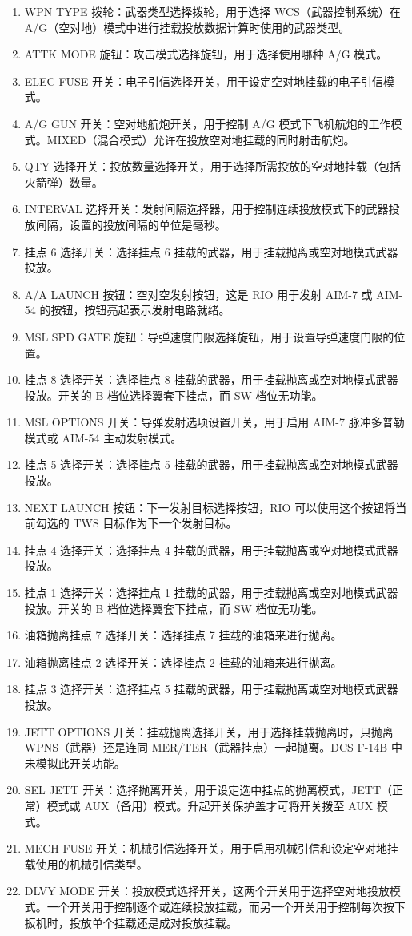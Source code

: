\begin{enumerate}
	\item WPN TYPE 拨轮：武器类型选择拨轮，用于选择 WCS（武器控制系统）在 A/G（空对地）模式中进行挂载投放数据计算时使用的武器类型。
	\item ATTK MODE 旋钮：攻击模式选择旋钮，用于选择使用哪种 A/G 模式。
	\item ELEC FUSE 开关：电子引信选择开关，用于设定空对地挂载的电子引信模式。
	\item A/G GUN 开关：空对地航炮开关，用于控制 A/G 模式下飞机航炮的工作模式。MIXED（混合模式）允许在投放空对地挂载的同时射击航炮。
	\item QTY 选择开关：投放数量选择开关，用于选择所需投放的空对地挂载（包括火箭弹）数量。
	\item INTERVAL 选择开关：发射间隔选择器，用于控制连续投放模式下的武器投放间隔，设置的投放间隔的单位是毫秒。
	\item 挂点 6 选择开关：选择挂点 6 挂载的武器，用于挂载抛离或空对地模式武器投放。
	\item A/A LAUNCH 按钮：空对空发射按钮，这是 RIO 用于发射 AIM-7 或 AIM-54 的按钮，按钮亮起表示发射电路就绪。
	\item MSL SPD GATE 旋钮：导弹速度门限选择旋钮，用于设置导弹速度门限的位置。
	\item 挂点 8 选择开关：选择挂点 8 挂载的武器，用于挂载抛离或空对地模式武器投放。开关的 B 档位选择翼套下挂点，而 SW 档位无功能。
	\item MSL OPTIONS 开关：导弹发射选项设置开关，用于启用 AIM-7 脉冲多普勒模式或 AIM-54 主动发射模式。
	\item 挂点 5 选择开关：选择挂点 5 挂载的武器，用于挂载抛离或空对地模式武器投放。
	\item NEXT LAUNCH 按钮：下一发射目标选择按钮，RIO 可以使用这个按钮将当前勾选的 TWS 目标作为下一个发射目标。
	\item 挂点 4 选择开关：选择挂点 4 挂载的武器，用于挂载抛离或空对地模式武器投放。
	\item 挂点 1 选择开关：选择挂点 1 挂载的武器，用于挂载抛离或空对地模式武器投放。开关的 B 档位选择翼套下挂点，而 SW 档位无功能。
	\item 油箱抛离挂点 7 选择开关：选择挂点 7 挂载的油箱来进行抛离。
	\item 油箱抛离挂点 2 选择开关：选择挂点 2 挂载的油箱来进行抛离。
	\item 挂点 3 选择开关：选择挂点 5 挂载的武器，用于挂载抛离或空对地模式武器投放。
	\item JETT OPTIONS 开关：挂载抛离选择开关，用于选择挂载抛离时，只抛离 WPNS（武器）还是连同 MER/TER（武器挂点）一起抛离。DCS F-14B 中未模拟此开关功能。
	\item SEL JETT 开关：选择抛离开关，用于设定选中挂点的抛离模式，JETT（正常）模式或 AUX（备用）模式。升起开关保护盖才可将开关拨至 AUX 模式。
	\item MECH FUSE 开关：机械引信选择开关，用于启用机械引信和设定空对地挂载使用的机械引信类型。
	\item DLVY MODE 开关：投放模式选择开关，这两个开关用于选择空对地投放模式。一个开关用于控制逐个或连续投放挂载，而另一个开关用于控制每次按下扳机时，投放单个挂载还是成对投放挂载。
\end{enumerate}


